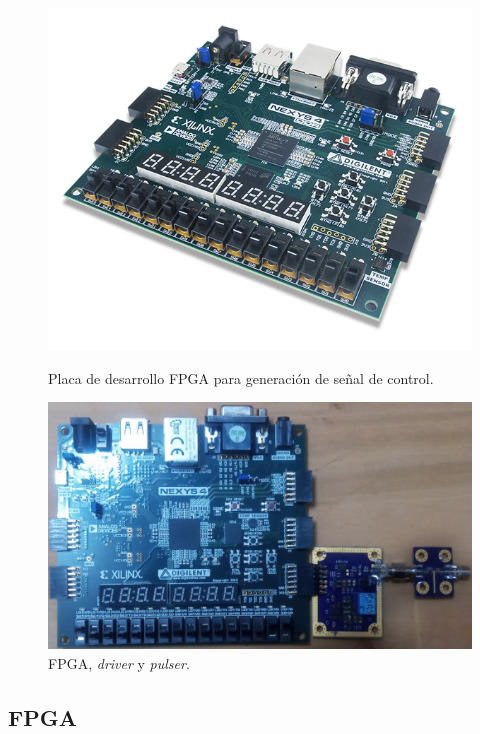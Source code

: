 \begin{figure}[t!]
    \begin{minipage}[t]{0.5\linewidth}
      \centering
        \includegraphics[width=1\textwidth]{images/mediciones_fpga.png}
        \caption{Placa de desarrollo FPGA para generación de señal de control.}
        \label{fig:mediciones_fpga}
    \end{minipage}
    \hfill
    \begin{minipage}[t]{0.5\linewidth}
        \centering
        \includegraphics[width=1\textwidth]{images/sistema_medido_small.jpg}
        \caption{FPGA, \textit{driver} y \textit{pulser}.}
        \label{fig:sistema_medido}
    \end{minipage}
\end{figure}

\subsection{FPGA}

